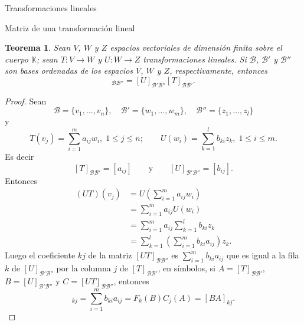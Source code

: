 \documentclass[a4paper,12pt,twoside,spanish,reqno]{amsbook}
\newtheorem{teorema}{Teorema}[section]
\theoremstyle{definition}
\theoremstyle{remark}
\newcommand{\K}{\mathbb K}
\begin{document}
\begin{chapter}{Transformaciones lineales}
\begin{section}{Matriz de una transformación lineal}
        \begin{teorema}\label{th-5.5}
            Sean $V$, $W$ y $Z$ espacios vectoriales de dimensión finita sobre el cuerpo $\K$; sean $T: V \to W$ y $U: W \to Z$  transformaciones lineales.  Si $\mathcal B$, $\mathcal B'$ y $\mathcal B''$ son bases ordenadas de los espacios $V$, $W$ y $Z$, respectivamente, entonces
            \begin{equation}
                [UT]_{\mathcal B\mathcal B''} = 	[U]_{\mathcal B'\mathcal B''} 	[T]_{\mathcal B\mathcal B'}.  
            \end{equation} 
        \end{teorema}
        \begin{proof}
            Sean
            \begin{equation*}
                 \mathcal B = \{v_1,\ldots,v_n\},\quad\mathcal B' = \{w_1,\ldots,w_m\},\quad  \mathcal B''= \{z_1,\ldots,z_l\}
            \end{equation*}
            y
            \begin{equation*}
            T(v_j) = \sum_{i=1}^m a_{ij} w_i, \; 1 \le j \le n; \qquad U(w_i) = \sum_{k=1}^l b_{ki} z_k, \; 1 \le i \le m.
            \end{equation*}
            Es decir 
            $$
            [T]_{\mathcal B\mathcal B'} = [a_{ij}]\qquad \text{y} \qquad [U]_{\mathcal B'\mathcal B''} = [b_{ij}]. 
            $$
            Entonces
            \begin{align*}
                (UT)(v_j) &= U(\sum_{i=1}^m a_{ij} w_i) \\
                &=  \sum_{i=1}^m a_{ij} U(w_i) \\
                &=  \sum_{i=1}^m a_{ij} \sum_{k=1}^l b_{ki} z_k \\
                &= \sum_{k=1}^l(\sum_{i=1}^m  b_{ki}a_{ij})  z_k.
            \end{align*}
            Luego el coeficiente $kj$ de la matriz $[UT]_{\mathcal B\mathcal B''}$ es $\sum_{i=1}^m  b_{ki}a_{ij}$ que es igual a la fila $k$ de $[U]_{\mathcal B'\mathcal B''}$ por la columna $j$ de  $[T]_{\mathcal B\mathcal B'}$,  en símbolos,  si $A= 	[T]_{\mathcal B\mathcal B'}$, $B = 	[U]_{\mathcal B'\mathcal B''}$ y $C = 	[UT]_{\mathcal B\mathcal B''}$, entonces
            \begin{equation*}
                [C]_{kj} = \sum_{i=1}^m  b_{ki}a_{ij} = F_k(B)C_j(A) = [BA]_{kj}.
            \end{equation*}
        \end{proof}	
            

\end{section}
\end{chapter}
\end{document}
